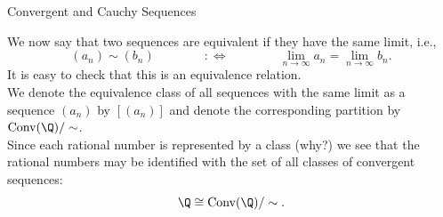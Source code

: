 \documentclass[smaller,hyperref={CJKbookmarks=true}]{beamer}
\begin{document}
\begin{frame}{Convergent and Cauchy Sequences}
\begin{spacing}{1.05}
We now say that two sequences are equivalent if they have the same limit,
i.e.,
\begin{equation}\label{1.5.3}
  (a_n)\sim(b_n)\qquad\qquad:\Leftrightarrow
  \qquad\qquad\lim_{n\to\infty}a_n=\lim_{n\to\infty}b_n.
\end{equation}
It is easy to check that this is an equivalence relation.\\[5pt]
We denote the equivalence class of all sequences with the same limit as a
sequence $(a_n)$ by $[(a_n)]$ and denote the corresponding partition by $\text{Conv}(\Q)/\sim$.\\[4pt]
Since each rational number is represented by a class (why?) we see that
the rational numbers may be identified with the set of all classes of
convergent sequences:
\[\Q\cong\text{Conv}(\Q)/\sim.\]
\end{spacing}
\end{frame}
\end{document}
